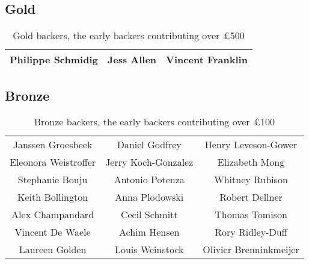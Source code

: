 \subsection{Gold}
\vspace{-3ex}
\begin{table}[h]
        \centering
\begin{tabular}{ c c c}
\toprule
Philippe Schmidig & Jess Allen & Vincent Franklin \\
\bottomrule
\end{tabular} 
\caption[Gold backers]{Gold backers, the early backers contributing over \pounds 500}
\end{table}


\subsection{Bronze}
\vspace{-3ex}
\begin{table}[h]
        \centering
\begin{tabular}{ c c c}
\toprule
Janssen Groesbeek & Daniel Godfrey & Henry Leveson-Gower \\
Eleonora Weistroffer & Jerry Koch-Gonzalez & Elizabeth Mong \\
Stephanie Bouju & Antonio Potenza & Whitney Rubison \\
Keith Bollington & Anna Plodowski & Robert Dellner \\
Alex Champandard & Cecil Schmitt & Thomas Tomison \\
Vincent De Waele & Achim Hensen & Rory Ridley-Duff\\
Laureen Golden & Louis Weinstock  & Olivier Brenninkmeijer  \\
\bottomrule
\end{tabular} 
\caption[Bronze backers]{Bronze backers, the early backers contributing over \pounds 100}
\end{table}
\clearpage